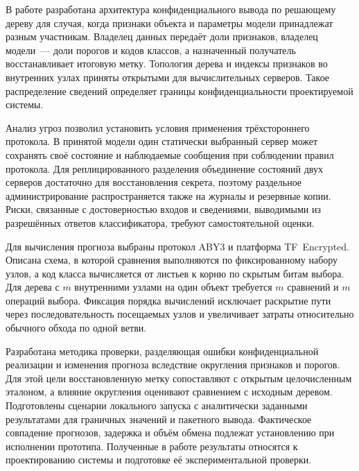 \conclusion

В работе разработана архитектура конфиденциального вывода по решающему
дереву для случая, когда признаки объекта и параметры модели принадлежат
разным участникам. Владелец данных передаёт доли признаков, владелец
модели~--- доли порогов и кодов классов, а назначенный получатель
восстанавливает итоговую метку. Топология дерева и индексы признаков
во внутренних узлах приняты открытыми для вычислительных серверов.
Такое распределение сведений определяет границы конфиденциальности
проектируемой системы.

Анализ угроз позволил установить условия применения трёхстороннего
протокола. В принятой модели один статически выбранный сервер может
сохранять своё состояние и наблюдаемые сообщения при соблюдении правил
протокола. Для реплицированного разделения объединение состояний двух
серверов достаточно для восстановления секрета, поэтому раздельное
администрирование распространяется также на журналы и резервные копии.
Риски, связанные с достоверностью входов и сведениями, выводимыми из
разрешённых ответов классификатора, требуют самостоятельной оценки.

Для вычисления прогноза выбраны протокол ABY3 и платформа TF~Encrypted.
Описана схема, в которой сравнения выполняются по фиксированному набору
узлов, а код класса вычисляется от листьев к корню по скрытым битам
выбора. Для дерева с $m$ внутренними узлами на один объект требуется
$m$ сравнений и $m$ операций выбора. Фиксация порядка вычислений исключает
раскрытие пути через последовательность посещаемых узлов и увеличивает
затраты относительно обычного обхода по одной ветви.

Разработана методика проверки, разделяющая ошибки конфиденциальной
реализации и изменения прогноза вследствие округления признаков и порогов.
Для этой цели восстановленную метку сопоставляют с открытым целочисленным
эталоном, а влияние округления оценивают сравнением с исходным деревом.
Подготовлены сценарии локального запуска с аналитически заданными
результатами для граничных значений и пакетного вывода. Фактическое
совпадение прогнозов, задержка и объём обмена подлежат установлению
при исполнении прототипа. Полученные в работе результаты относятся
к проектированию системы и подготовке её экспериментальной проверки.
